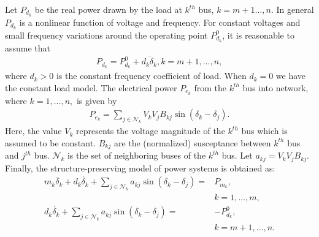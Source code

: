\documentclass[final]{IEEEtran}
\begin{document}
Let $P_{d_k}$ be the real power drawn by the load at
$k^{th}$
bus, $k=m+1\dots,n$. In general $P_{d_k}$ is a nonlinear function of voltage and frequency. For constant voltages and small
frequency variations around the operating point $P^0_{d_k}$, it is reasonable to assume that
\begin{align}
P_{d_k}=P^0_{d_k} + d_k \dot{\delta}_k, k=m+1,\dots,n,
\end{align}
where $d_k>0$ is  the constant frequency coefficient of load. When $d_k=0$ we have the constant load model.
The electrical power $P_{e_k}$
 from the
$k^{th}$ bus into network, where $k=1,...,n,$ is given by
\begin{align}
\label{eq.electricpower}
  P_{e_k}=\sum_{j \in
  \mathcal{N}_k} V_kV_jB_{kj} \sin(\delta_k
  -\delta_j).
\end{align}
Here, the value $V_k$ represents the voltage
magnitude of the $k^{th}$ bus which is
assumed to be constant. 
$B_{kj}$ are the (normalized)  susceptance between $k^{th}$ bus and $j^{th}$ bus. $\mathcal{N}_k$ is the set of neighboring
buses of the $k^{th}$ bus. Let $a_{kj}=V_kV_jB_{kj}.$
Finally, the structure-preserving model of power systems is obtained as:
\begin{align}
\label{eq.structure-preserving}
 m_k \ddot{\delta_k} + d_k \dot{\delta_k} + \sum_{j \in
  \mathcal{N}_k} a_{kj} \sin(\delta_k-\delta_j) = &P_{m_k},  \\ 
  &k=1,\dots,m,  \nonumber\\
  \label{eq.structure-preserving2}
  d_k \dot{\delta_k} + \sum_{j \in
  \mathcal{N}_k} a_{kj} \sin(\delta_k-\delta_j) = &-P^0_{d_k},  \\ 
  & k=m+1,\dots,n. \nonumber
\end{align}
\end{document}
